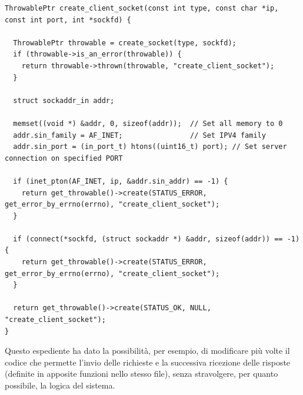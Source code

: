 \documentclass[italian]{tktltiki2}
\begin{document}
\begin{lstlisting}
ThrowablePtr create_client_socket(const int type, const char *ip, const int port, int *sockfd) {

  ThrowablePtr throwable = create_socket(type, sockfd);
  if (throwable->is_an_error(throwable)) {
    return throwable->thrown(throwable, "create_client_socket");
  }

  struct sockaddr_in addr;

  memset((void *) &addr, 0, sizeof(addr));  // Set all memory to 0
  addr.sin_family = AF_INET;                // Set IPV4 family
  addr.sin_port = (in_port_t) htons((uint16_t) port); // Set server connection on specified PORT

  if (inet_pton(AF_INET, ip, &addr.sin_addr) == -1) {
    return get_throwable()->create(STATUS_ERROR, get_error_by_errno(errno), "create_client_socket");
  }

  if (connect(*sockfd, (struct sockaddr *) &addr, sizeof(addr)) == -1) {
    return get_throwable()->create(STATUS_ERROR, get_error_by_errno(errno), "create_client_socket");
  }

  return get_throwable()->create(STATUS_OK, NULL, "create_client_socket");
}
\end{lstlisting}
Questo espediente ha dato la possibilità, per esempio, di modificare più volte il codice che permette l'invio delle richieste e la successiva ricezione delle risposte (definite in apposite funzioni nello stesso file), senza stravolgere, per quanto possibile, la logica del sistema.
\end{document}
